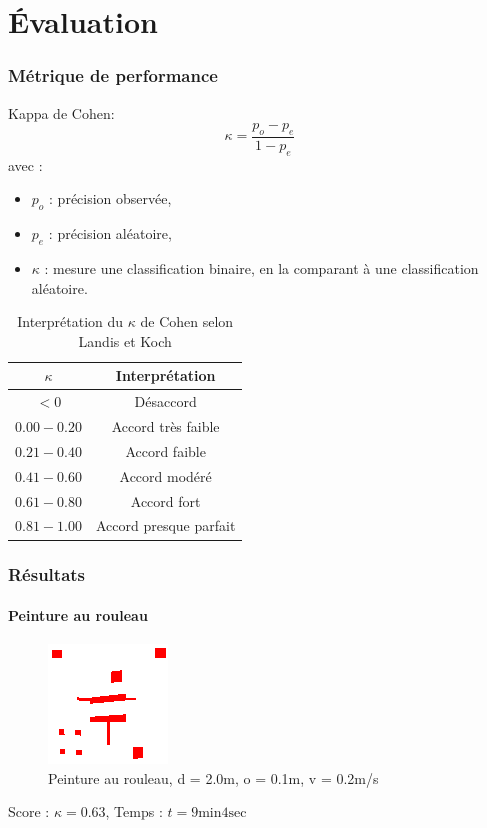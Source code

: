 \documentclass{beamer}
\begin{document}
	\section{Évaluation}
		\begin{frame}
			\frametitle{Métrique de performance}
			Kappa de Cohen:
			\begin{equation*}
				\kappa = \frac{p_o - p_e}{1 - p_e}
			\end{equation*}
			avec :
			\begin{itemize}
				\item $p_o$ : précision observée,
				\item $p_e$ : précision aléatoire,
				\item $\kappa$ : mesure une classification binaire, en la comparant à une classification aléatoire.
			\end{itemize}
			\begin{table}
				\centering
				\begin{tabular}{|c|c|}
					\hline
					$\kappa$ & Interprétation \\
					\hline
					$< 0$ & Désaccord \\
					\hline
					$0.00 - 0.20$ & Accord très faible \\
					\hline
					$0.21 - 0.40$ & Accord faible \\
					\hline
					$0.41 - 0.60$ & Accord modéré \\
					\hline
					$0.61 - 0.80$ & Accord fort \\
					\hline
					$0.81 - 1.00$ & Accord presque parfait \\
					\hline
				\end{tabular}
				\caption{Interprétation du $\kappa$ de Cohen selon Landis et Koch}
			\end{table}
		\end{frame}
		\begin{frame}
			\frametitle{Résultats}
			\framesubtitle{Peinture au rouleau}
			\begin{figure}
				\centering
				\includegraphics[scale=1.0]{graphics/d=2.0_o=0.1_v=0.2.png}
				\caption{Peinture au rouleau, d = 2.0m, o = 0.1m, v = 0.2m/s}
			\end{figure}
			Score : $\kappa = 0.63$, Temps : $t = 9 \text{min} 4 \text{sec}$
		\end{frame}
\end{document}
